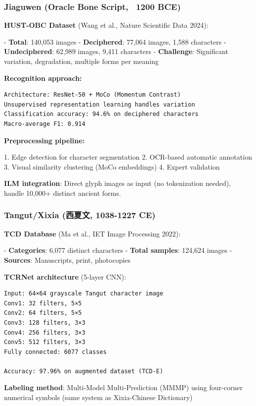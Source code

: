 \documentclass[11pt]{article}
\begin{document}
\subsubsection{Jiaguwen (Oracle Bone Script, ~1200 BCE)}

\textbf{HUST-OBC Dataset} (Wang et al., Nature Scientific Data 2024):

- \textbf{Total}: 140,053 images
- \textbf{Deciphered}: 77,064 images, 1,588 characters
- \textbf{Undeciphered}: 62,989 images, 9,411 characters
- \textbf{Challenge}: Significant variation, degradation, multiple forms per meaning

\textbf{Recognition approach:}

\begin{verbatim}
Architecture: ResNet-50 + MoCo (Momentum Contrast)
Unsupervised representation learning handles variation
Classification accuracy: 94.6% on deciphered characters
Macro-average F1: 0.914
\end{verbatim}

\textbf{Preprocessing pipeline:}

1. Edge detection for character segmentation
2. OCR-based automatic annotation
3. Visual similarity clustering (MoCo embeddings)
4. Expert validation

\textbf{ILM integration}: Direct glyph images as input (no tokenization needed), handle 10,000+ distinct ancient forms.

\subsubsection{Tangut/Xixia (西夏文, 1038-1227 CE)}

\textbf{TCD Database} (Ma et al., IET Image Processing 2022):

- \textbf{Categories}: 6,077 distinct characters
- \textbf{Total samples}: 124,624 images
- \textbf{Sources}: Manuscripts, print, photocopies

\textbf{TCRNet architecture} (5-layer CNN):

\begin{verbatim}
Input: 64×64 grayscale Tangut character image
Conv1: 32 filters, 5×5
Conv2: 64 filters, 5×5
Conv3: 128 filters, 3×3
Conv4: 256 filters, 3×3
Conv5: 512 filters, 3×3
Fully connected: 6077 classes

Accuracy: 97.96% on augmented dataset (TCD-E)
\end{verbatim}

\textbf{Labeling method}: Multi-Model Multi-Prediction (MMMP) using four-corner numerical symbols (same system as Xixia-Chinese Dictionary)
\end{document}

